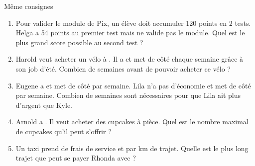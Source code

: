 \documentclass[main.tex]{subfiles}
\begin{document}
\begin{exercise} \label{chapter08:exo:vocabulaire01}
	Même consignes  
	\begin{enumerate}[label=\alph*), leftmargin=*]
		\item Pour valider le module de Pix, un élève doit accumuler 120 points en 2 tests. Helga a 54 points au premier test mais ne valide pas le module. Quel est le plus grand score possible au second test ?
		\item Harold veut acheter un vélo à . Il a  et met de côté  chaque semaine grâce à son job d'été. Combien de semaines avant de pouvoir acheter ce vélo ?
		\item Eugene a  et met de côté  par semaine. Lila n'a pas d'économie et met de côté  par semaine. Combien de semaines sont nécessaires pour que Lila ait plus d'argent que Kyle. 
		\item Arnold a . Il veut acheter des cupcakes à  pièce. Quel est le nombre maximal de cupcakes qu'il peut s'offrir ?
		\item Un taxi prend  de frais de service et  par \si{\kilo\meter} de trajet. Quelle est le plus long trajet que peut se payer Rhonda avec  ?
	\end{enumerate}
\end{exercise} 
\begin{exercise}\label{chapter08:exo:vocabulaire02}\hfill 
	
	\noindent{}  
\end{exercise}
\end{document}
